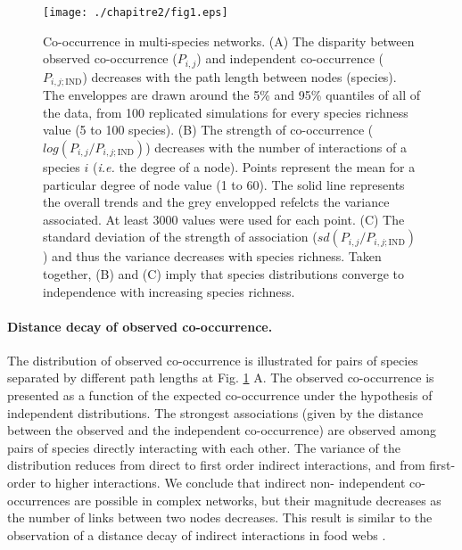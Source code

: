 \begin{figure}[h]
\texttt{[image: ./chapitre2/fig1.eps]}
\caption[Co-occurrence in multi-species networks]{Co-occurrence in multi-species networks.
(A) The disparity between observed co-occurrence ($P_{i,j}$) and independent co-occurrence ($P_{i,j;\text{IND}}$) decreases with the path length between nodes (species). The enveloppes are drawn around the 5\% and 95\% quantiles of all of the data, from 100 replicated simulations for every species richness value (5 to 100 species).
(B) The strength of co-occurrence ($log(P_{i,j}/P_{i,j;\text{IND}})$) decreases with the number of interactions of a species $i$ (\textit{i.e.} the degree of a node). Points represent the mean for a particular degree of node value (1 to 60). The solid line represents the overall trends and the grey envelopped refelcts the variance associated. At least 3000 values were used for each point.
(C) The standard deviation of the strength of association ($sd(P_{i,j}/P_{i,j;\text{IND}})$) and thus the variance decreases with species richness. Taken together, (B) and (C) imply that species distributions converge to independence with increasing species richness.}
\label{figchap2_1}
\end{figure}

\paragraph*{Distance decay of observed co-occurrence.} The distribution of
observed co-occurrence is illustrated for pairs of species separated by
different path lengths at Fig. \ref{figchap2_1} A. The observed co-occurrence is presented
as a function of the expected co-occurrence under the hypothesis of
independent distributions. The strongest associations (given by the distance
between the observed and the independent co-occurrence) are observed among
pairs of species directly interacting with each other. The variance of the
distribution reduces from direct to first order indirect interactions, and
from first-order to higher interactions. We conclude that indirect non-
independent co-occurrences are possible in complex networks, but their
magnitude decreases as the number of links between two nodes decreases. This
result is similar to the observation of a distance decay of indirect
interactions in food webs \citep{Berlow2009}.



